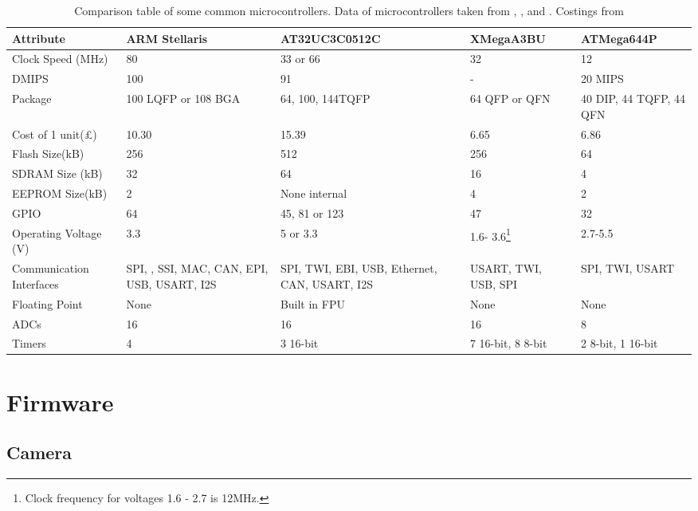 \begin{table}
\caption{Comparison table of some common microcontrollers. Data of microcontrollers taken from \cite{Atmel:UC3C}, \cite{Atmel:644P}, \cite{Atmel:A3BU} and \cite{ARM:Stellaris}. Costings from \cite{Farnell}}
\label{tab:uCComp}
\centering
\begin{tabular}{p{2.5cm}p{2.5cm}p{3cm}p{2.3cm}p{2.4cm}}\toprule
\textbf{Attribute}				& 	\textbf{ARM Stellaris}		&	\textbf{AT32UC3C0512C} 		&	\textbf{XMegaA3BU}	&	\textbf{ATMega644P} 	\\	\toprule
Clock Speed	(MHz)		&	80					&	33 or 66			&	32			&	12			\\\midrule
DMIPS					&	100					&	91					&	-			&	20 MIPS		\\\midrule
Package					&	100 LQFP or 108 BGA	&	64, 100, 144TQFP	&	64 QFP or QFN & 40 DIP, 44 TQFP, 44 QFN \\\midrule
Cost of 1 unit(\pounds)	&	10.30				& 15.39 &	6.65	 & 6.86\\\midrule
Flash Size(kB)			&	256					&	512					&	256			&	64 \\\midrule
SDRAM Size (kB)			&	32					&	64					&	16			&	4	\\\midrule
EEPROM Size(kB)			&	2					&	None internal		&	4			&	2 	\\\midrule
GPIO					&	64					& 	45, 81 or 123		&	47			& 	32	\\\midrule
Operating Voltage (V)	&	3.3					& 	5	or 3.3			& 	1.6- 3.6\footnote{Clock frequency for voltages 1.6 - 2.7 is 12MHz.}		& 	2.7-5.5	\\\midrule
Communication Interfaces &	SPI, \itc, SSI, MAC, CAN, EPI, USB, USART, I2S	& SPI, TWI, EBI, USB, Ethernet, CAN, USART, I2S	&	USART, TWI, USB, SPI 		&	SPI, TWI, USART \\\midrule
Floating Point			&	None				&	Built in FPU		&	None		&	None		\\\midrule
ADCs					&	16					&	16					&	16			&	8			\\\midrule
Timers					&	4					&	3 16-bit			& 7 16-bit, 8 8-bit & 2 8-bit, 1 16-bit \\
\bottomrule
\end{tabular}
\end{table}

\section{Firmware}
\subsection{Camera}

